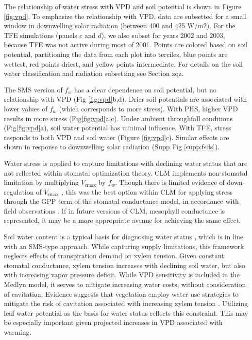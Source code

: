\documentclass[draft,linenumbers]{agujournal}
\begin{document}
The relationship of water stress with VPD and soil potential is shown in Figure \ref{fig:vpd}. 
To emphasize the relationship with VPD, data are subsetted for a small window in downwelling solar radiation (between 400 and 425 W/m2).
For the TFE simulations (panels $c$ and $d$), we also subset for years 2002 and 2003, because TFE was not active during most of 2001.
Points are colored based on soil potential, partitioning the data from each plot into terciles, blue points are wettest, red points driest, and yellow points intermediate.
For details on the soil water classification and radiation subsetting see Section zqz.

The SMS version of $f_w$ has a clear dependence on soil potential, but no relationship with VPD (Fig \ref{fig:vpd}b,d). 
Drier soil potentials are associated with lower values of $f_w$ (which corresponds to more stress).
With PHS, higher VPD results in more stress (Fig\ref{fig:vpd}a,c).
Under ambient throughfall conditions (Fig\ref{fig:vpd}a), soil water potential has minimal influence.
With TFE, stress responds to both VPD and soil water (Figure \ref{fig:vpd}c).
Similar effects are shown in response to downwelling solar radiation (Supp Fig \ref{supp:fsds}).

Water stress is applied to capture limitations with declining water status that are not reflected within stomatal optimization theory.
CLM implements non-stomatal limitation by multiplying $V_{\text{cmax}}$ by $f_w$.
Though there is limited evidence of down-regulation of $V_{\text{cmax}}$ \citep{flexas2006}, this was the best option within CLM 
for applying stress through the GPP term of the stomatal conductance model, in accordance with field observations \citep{lin2018,zhou2013}.
If in future versions of CLM, mesophyll conductance is represented, it may be a more appropriate avenue for achieving the same effect.

Soil water content is a typical basis for diagnosing water status \citep{drake2017}, which is in line with an SMS-type approach.
While capturing supply limitations, this framework neglects effects of transpiration demand on xylem tension.
Given constant stomatal conductance, xylem tension increases with declining soil water, but also with increasing vapor pressure deficit.
While VPD sensitivity is included in the Medlyn model, it serves to mitigate increasing water costs, without consideration of cavitation.
Evidence suggests that vegetation employ water use strategies to mitigate the risk of cavitation associated with increasing xylem tension \citep{sperry1998,fisher2006,choat2012}.
Utilizing leaf water potential as the basis for water status reflects this constraint.
This may be especially important given projected increases in VPD associated with warming.
\end{document}
